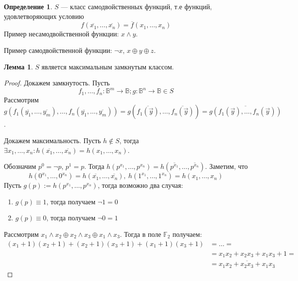 \documentclass[12pt]{article}
\let\eq\equiv
\let\la\land
\let\n\neg
\let\nin\notin
\theoremstyle{definition}
\newtheorem{definition}{Определение}[section]
\theoremstyle{statement}
\theoremstyle{theorem}
\newtheorem{lemma}{Лемма}[section]
\begin{document}
\begin{definition}
  $S$ --- класс самодвойственных функций, т.е функций, удовлетворяющих условию
  \begin{displaymath}
    f(\overline{x_1}, \dots, \overline{x_n}) = \overline{f}(x_1, \dots, x_n)
  \end{displaymath}
  Пример несамодвойственной функции: $x \la y$.

  Пример самодвойственной функции: $\n x$, $x \oplus y \oplus z$.
\end{definition}
\begin{lemma}
  $S$ является максимальным замкнутым классом.
  \begin{proof}
    Докажем замкнутость. Пусть
    \begin{displaymath}
      f_1, \dots, f_n \colon \mathbb{B}^m \to \mathbb{B}; g \colon
      \mathbb{B}^n \to \mathbb{B} \in S
    \end{displaymath}
    Рассмотрим $g(f_1(\overline{y_1}, \dots, \overline{y_m}), \dots,
    f_n(\overline{y_1}, \dots, \overline{y_m})) =
    g(\overline{f_1(\vec{y})}, \dots, \overline{f_n(\vec{y})}) =
    \overline{g(f_1(\vec{y}), \dots, f_n(\vec{y}))}$.

    Докажем максимальность. Пусть $h \nin S$, тогда $\exists x_1,
    \dots, x_n \colon h(\overline{x_1}, \dots, \overline{x_n}) =
    h(x_1, \dots, x_n)$.

    Обозначим $p^0 = \n p$, $p^1 = p$. Тогда $h(p^{x_1}, \dots,
    p^{x_n}) = h(\overline{p^{x_1}}, \dots, \overline{p^{x_n}})$. Заметим, что
    \begin{displaymath}
      h(0^{x_1}, \dots, 0^{x_n}) = h(\overline{x_1}, \dots,
      \overline{x_n}),\ h(1^{x_1}, \dots, 1^{x_n}) = h(x_1, \dots, x_n)
    \end{displaymath}
    Пусть $g(p) := h(p^{x_1}, \dots, p^{x_n})$, тогда возможно два случая:
    \begin{enumerate}
      \item $g(p) \eq 1$, тогда получаем $\n 1 = 0$

      \item $g(p) \eq 0$, тогда получаем $\n 0 = 1$
    \end{enumerate}
    Рассмотрим $x_1 \la x_2 \oplus x_2 \la x_3 \oplus x_1 \la x_3$.
    Тогда в поле $\mathbb{F}_2$ получаем:
    \begin{align*}
      (x_1 + 1)(x_2 + 1) + (x_2 + 1)(x_3 + 1) + (x_1 + 1)(x_3 + 1) &=
      \dots =\\&=
      x_1x_2 + x_2x_3 + x_1x_3 + 1 =\\&= \overline{x_1x_2 + x_2x_3 + x_1x_3}
    \end{align*}
  \end{proof}
\end{lemma}
\end{document}
